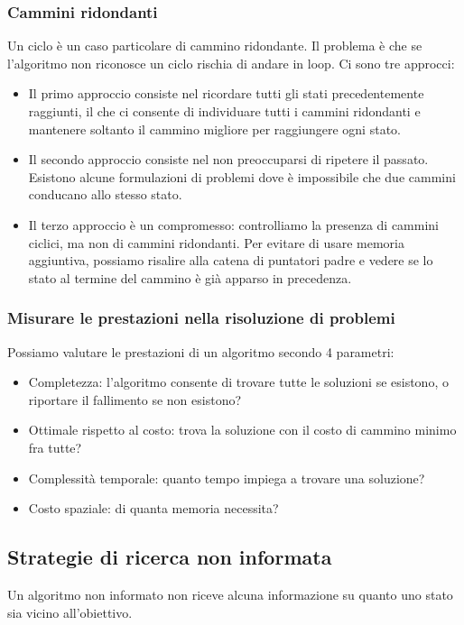 \documentclass{article}
\begin{document}
\subsubsection{Cammini ridondanti}
Un ciclo è un caso particolare di cammino ridondante. Il problema è che se l'algoritmo non riconosce un ciclo rischia di andare in loop. Ci sono tre approcci:
\begin{itemize}
    \item Il primo approccio consiste nel ricordare tutti gli stati precedentemente raggiunti, il che ci consente di individuare tutti i cammini ridondanti e mantenere soltanto il cammino migliore per raggiungere ogni stato.
    \item Il secondo approccio consiste nel non preoccuparsi di ripetere il passato. Esistono alcune formulazioni di problemi dove è impossibile che due cammini conducano allo stesso stato.
    \item Il terzo approccio è un compromesso: controlliamo la presenza di cammini ciclici, ma non di cammini ridondanti. Per evitare di usare memoria aggiuntiva, possiamo risalire alla catena di puntatori padre e vedere se lo stato al termine del cammino è già apparso in precedenza.
\end{itemize}
\newpage
\subsubsection{Misurare le prestazioni nella risoluzione di problemi}
Possiamo valutare le prestazioni di un algoritmo secondo 4 parametri:
\begin{itemize}
    \item Completezza: l'algoritmo consente di trovare tutte le soluzioni se esistono, o riportare il fallimento se non esistono?
    \item Ottimale rispetto al costo: trova la soluzione con il costo di cammino minimo fra tutte?
    \item Complessità temporale: quanto tempo impiega a trovare una soluzione?
    \item Costo spaziale: di quanta memoria necessita?
\end{itemize}
\newpage
\subsection{Strategie di ricerca non informata}
Un algoritmo non informato non riceve alcuna informazione su quanto uno stato sia vicino all'obiettivo.
\end{document}
